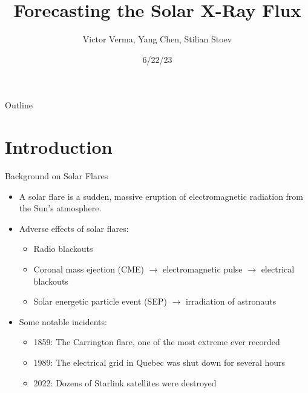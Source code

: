 \documentclass{beamer}
\title[Forecasting the Solar X-Ray Flux]{Forecasting the Solar X-Ray Flux}
\author{Victor Verma, Yang Chen, Stilian Stoev}
\institute[]
{
Department of Statistics \\
University of Michigan
}
\date[6/22/23]{6/22/23}
\begin{document}
\begin{frame}
    \titlepage
\end{frame}

\begin{frame}{Outline}
   \tableofcontents
\end{frame}

\section{Introduction}

\begin{frame}{Background on Solar Flares}
    \begin{itemize}
        \item A solar flare is a sudden, massive eruption of electromagnetic radiation from the Sun's atmosphere.
        \item Adverse effects of solar flares: 
        \begin{itemize}
            \item Radio blackouts
            \item Coronal mass ejection (CME) $\rightarrow$ electromagnetic pulse $\rightarrow$ electrical blackouts
            \item Solar energetic particle event (SEP) $\rightarrow$ irradiation of astronauts
        \end{itemize}
        \item Some notable incidents:
        \begin{itemize}
            \item 1859: The Carrington flare, one of the most extreme ever recorded
            \item 1989: The electrical grid in Quebec was shut down for several hours
            \item 2022: Dozens of Starlink satellites were destroyed
        \end{itemize}
    \end{itemize}
\end{frame}
\end{document}
